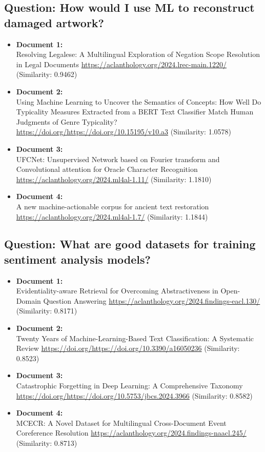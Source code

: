 \documentclass[fleqn,moreauthors,10pt]{ds_report}
\begin{document}
\subsection*{Question: How would I use ML to reconstruct damaged artwork?}

\begin{itemize}
  \item \textbf{Document 1:} \\
  Resolving Legalese: A Multilingual Exploration of Negation Scope Resolution in Legal Documents \url{https://aclanthology.org/2024.lrec-main.1220/} (Similarity: 0.9462)
  \item \textbf{Document 2:} \\
  Using Machine Learning to Uncover the Semantics of Concepts: How Well Do Typicality Measures Extracted from a BERT Text Classifier Match Human Judgments of Genre Typicality? \url{https://doi.org/https://doi.org/10.15195/v10.a3} (Similarity: 1.0578)
  \item \textbf{Document 3:} \\
  UFCNet: Unsupervised Network based on Fourier transform and Convolutional attention for Oracle Character Recognition \url{https://aclanthology.org/2024.ml4al-1.11/} (Similarity: 1.1810)
  \item \textbf{Document 4:} \\
  A new machine-actionable corpus for ancient text restoration \url{https://aclanthology.org/2024.ml4al-1.7/} (Similarity: 1.1844)
\end{itemize}

\subsection*{Question: What are good datasets for training sentiment analysis models?}

\begin{itemize}
  \item \textbf{Document 1:} \\
  Evidentiality-aware Retrieval for Overcoming Abstractiveness in Open-Domain Question Answering \url{https://aclanthology.org/2024.findings-eacl.130/} (Similarity: 0.8171)
  \item \textbf{Document 2:} \\
  Twenty Years of Machine-Learning-Based Text Classification: A Systematic Review \url{https://doi.org/https://doi.org/10.3390/a16050236} (Similarity: 0.8523)
  \item \textbf{Document 3:} \\
  Catastrophic Forgetting in Deep Learning: A Comprehensive Taxonomy \url{https://doi.org/https://doi.org/10.5753/jbcs.2024.3966} (Similarity: 0.8582)
  \item \textbf{Document 4:} \\
  MCECR: A Novel Dataset for Multilingual Cross-Document Event Coreference Resolution \url{https://aclanthology.org/2024.findings-naacl.245/} (Similarity: 0.8713)
\end{itemize}
\end{document}
